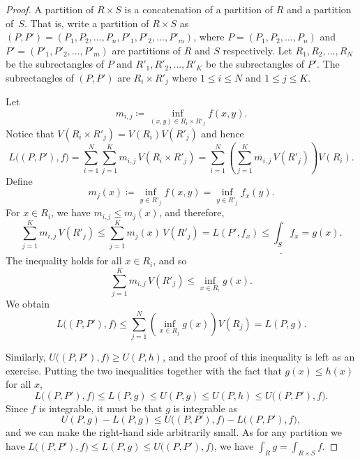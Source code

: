\begin{proof}
A partition of $R \times S$ is a concatenation of a partition of $R$ and a
partition of~$S$.  That is, write a partition of $R \times S$
as $(P,P') = (P_1,P_2,\ldots,P_n,P'_1,P'_2,\ldots,P'_m)$,
where
$P = (P_1,P_2,\ldots,P_n)$ and
$P' = (P'_1,P'_2,\ldots,P'_m)$ are partitions of $R$ and $S$ respectively.
Let
$R_1,R_2,\ldots,R_N$ be the subrectangles of $P$ and
$R'_1,R'_2,\ldots,R'_K$ be the subrectangles of $P'$.
The subrectangles of $(P,P')$ are
$R_i \times R'_j$ where $1 \leq i \leq N$ and $1 \leq j \leq K$.

Let
\begin{equation*}
m_{i,j} \coloneqq
\inf_{(x,y) \in R_i \times R'_j} f(x,y) .
\end{equation*}
Notice that
$V(R_i \times R'_j) = V(R_i)V(R'_j)$ and hence
\begin{equation*}
L\bigl((P,P'),f\bigr) =
\sum_{i=1}^N
\sum_{j=1}^K
m_{i,j} \, V(R_i \times R'_j)
=
\sum_{i=1}^N
\left(
\sum_{j=1}^K
m_{i,j} \, V(R'_j) \right) V(R_i) .
\end{equation*}
Define
\begin{equation*}
m_j(x) \coloneqq \inf_{y \in R'_j} f(x,y) = \inf_{y \in R'_j} f_x(y) .
\end{equation*}
For $x \in R_i$, we have $m_{i,j} \leq m_j(x)$, and therefore,
\begin{equation*}
\sum_{j=1}^K
m_{i,j} \, V(R'_j)
\leq \sum_{j=1}^K m_j(x) \, V(R'_j) = L(P',f_x) \leq
\underline{\int_S} f_x = g(x) .
\end{equation*}
The inequality holds for all $x \in R_i$, and so
\begin{equation*}
\sum_{j=1}^K
m_{i,j} \, V(R'_j)
\leq \inf_{x \in R_i} g(x) .
\end{equation*}
We obtain
\begin{equation*}
L\bigl((P,P'),f\bigr) 
\leq
\sum_{j=1}^N
\left(
\inf_{x \in R_j} g(x)
\right) V(R_j) = L(P,g) .
\end{equation*}

Similarly, $U\bigl((P,P'),f) \geq U(P,h)$, and the proof of this inequality is
left as an exercise.
Putting the two inequalities together with the fact that $g(x) \leq h(x)$ for all $x$,
\begin{equation*}
L\bigl((P,P'),f\bigr)
\leq
L(P,g) \leq
U(P,g) \leq
U(P,h) \leq
U\bigl((P,P'),f\bigr) .
\end{equation*}
Since $f$ is integrable, it must be that $g$ is integrable as
\begin{equation*}
U(P,g) - L(P,g)
\leq
U\bigl((P,P'),f\bigr) -
L\bigl((P,P'),f\bigr) ,
\end{equation*}
and we can make the right-hand side arbitrarily small.
As for any partition we have 
$L\bigl((P,P'),f\bigr) \leq L(P,g) \leq U\bigl((P,P'),f\bigr)$, we have
$\int_R g = \int_{R \times S} f$.


\end{proof}
